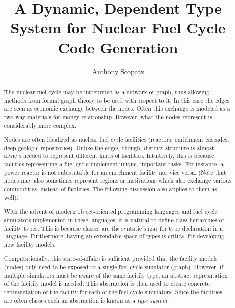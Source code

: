 \documentclass{ansconf}
\begin{document}
\title{A Dynamic, Dependent Type System for Nuclear Fuel Cycle Code Generation}

\author{Anthony Scopatz}

\maketitle

\begin{abstract}
\raggedright
The nuclear fuel cycle may be intrepreted as a network or graph, thus 
allowing methods from formal graph theory \cite{DIE05B} to be used with 
respect to it.  In this case the edges are seen as economic exchange 
between the nodes.  Often this exchange is modeled as a two way materials-for-money 
relationship.  However, what the nodes represent is considerably 
more complex.  

Nodes are often idealized as nuclear fuel cycle facilities (reactors, enrichment
cascades, deep geologic repositories).  Unlike the edges, though, distinct structure
is almost always needed to represent different kinds of facilities.  Intuitively, 
this is because facilties representing a fuel cycle implement unique, important 
tasks.  For instance, a power reactor is not subistutable for an enrichment facility
nor vice versa.  (Note that nodes may also sometimes 
represent regions or institutions which also exchange various commodities, 
instead of facilities.  The following discussion also applies to them as well).

With the advent of modern object-oriented programming languages and fuel cycle
simulators implemented in these languages, it is natural to define class heirarchies
of facility types.  This is because classes are the syntatic sugar for type 
declaration in a language.  Furthermore, having an extendable space of types is 
critical for developing new facility models.

Computationally, this state-of-affairs is sufficient provided that the facility 
models (nodes) only need to be exposed to a single fuel cycle simulator (graph).
However, if multiple simulators must be aware of the same facitily type, an 
abstract represntation of the facitily model is needed.  This abstraction is then
used to create concrete representation of the facility for each of the fuel cycle
simulators.  Since the facilities are often classes such an abstraction is 
known as a \emph{type system} \cite{Pierce:2002:TPL:509043}.


\end{abstract}
\end{document}
